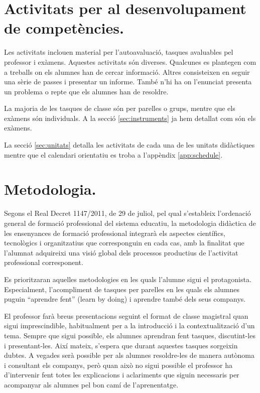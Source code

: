 \documentclass[catalan, a4paper, 12pt, titlepage]{article}
\begin{document}
\section{Activitats per al desenvolupament de competències.}
\label{sec:activitats}

Les activitats inclouen material per l'autoavaluació, tasques avaluables pel professor i exàmens.
Aquestes activitats són diverses.
Qualcunes es plantegen com a treballs on els alumnes han de cercar informació.
Altres consisteixen en seguir una sèrie de passes i presentar un informe.
També n'hi ha on l'enunciat presenta un problema o repte que els alumnes han de resoldre.

La majoria de les tasques de classe són per parelles o grups, mentre que els exàmens són individuals.
A la secció \ref{sec:instruments} ja hem detallat com són els exàmens.

La secció \ref{sec:unitats} detalla les activitats de cada una de les unitats didàctiques mentre que el calendari orientatiu es troba a l'appèndix \ref{app:schedule}.

\section{Metodologia.}
\label{sec:metodologia}

Segons el Real Decret 1147/2011, de 29 de juliol, pel qual s'estableix l'ordenació general de formació professional del sistema educatiu, la metodologia didàctica de les ensenyances de formació professional integrarà els aspectes científics, tecnològics i organitzatius que corresponguin en cada cas, amb la finalitat que l'alumnat adquireixi una visió global dels processos productius de l'activitat professional corresponent.

Es prioritzaran aquelles metodologies en les quals l'alumne sigui el protagonista. Especialment, l'acompliment de tasques per parelles en les quals els alumnes puguin ``aprendre fent'' (learn by doing) i aprendre també dels seus companys.

El professor farà breus presentacions seguint el format de classe magistral quan sigui imprescindible, habitualment per a la introducció i la contextualització d'un tema.
Sempre que sigui possible, els alumnes aprendran fent tasques, discutint-les i presentant-les.
Així mateix, s'espera que durant aquestes tasques sorgeixin dubtes. 
A vegades serà possible per als alumnes resoldre-les de manera autònoma i consultant els companys, però quan això no sigui possible el professor ha d'intervenir fent totes les explicacions i aclariments que siguin necessaris per acompanyar als alumnes pel bon camí de l'aprenentatge.
\end{document}
